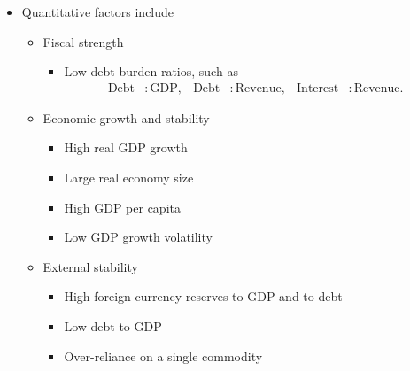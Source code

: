 \documentclass[../notes_compiled.tex]{subfiles}
\begin{document}
\begin{itemize}
\item Quantitative factors include
\begin{itemize}
\item Fiscal strength
\begin{itemize}
\item Low debt burden ratios, such as
\begin{align*}
\text{Debt}&:\text{GDP}, & \text{Debt}&:\text{Revenue}, & \text{Interest}&:\text{Revenue}.
\end{align*}
\end{itemize}
\item Economic growth and stability
\begin{multicols}{2}
\begin{itemize}
\item High real GDP growth 
\item Large real economy size
\item High GDP per capita
\item Low GDP growth volatility
\end{itemize}
\end{multicols}
\item External stability
\begin{multicols}{2}
\begin{itemize}
\item High foreign currency reserves to GDP and to debt
\item Low debt to GDP
\item Over-reliance on a single commodity
\end{itemize}
\end{multicols}
\end{itemize}

\end{itemize}
\end{document}
